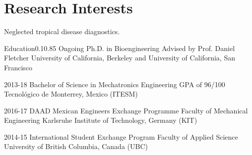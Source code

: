 \documentclass{federico_cv}
\begin{document}
{}
{}


\section{Research Interests}
Neglected tropical disease diagnostics.


\begin{tblSection}{Education}{0.1}{0.85}
\degree
{Ongoing}
{Ph.D. in Bioengineering}
{Advised by Prof. Daniel Fletcher}
{University of California, Berkeley and University of California, San Francisco}

\degree
{2013-18}
{Bachelor of Science in Mechatronics Engineering}
{GPA of 96/100}
{Tecnológico de Monterrey, Mexico (ITESM)}

\degree
{2016-17}
{DAAD Mexican Engineers Exchange Programme}
{Faculty of Mechanical Engineering}
{Karlsruhe Institute of Technology, Germany (KIT)}

\degree
{2014-15}
{International Student Exchange Program}
{Faculty of Applied Science}
{University of British Columbia, Canada (UBC)}

\end{tblSection}


\nocite{*}
\printbibliography[keyword={Publications},title={Publications},resetnumbers=true]
\end{document}
